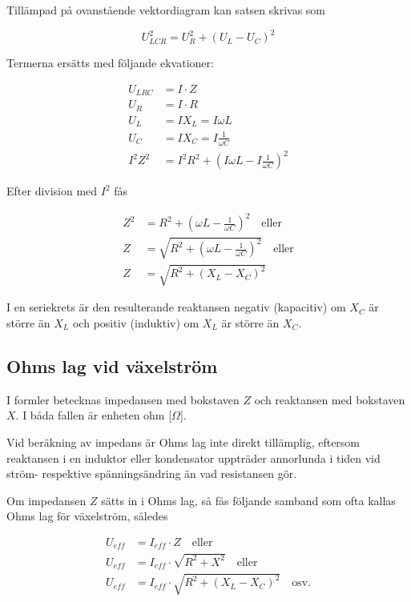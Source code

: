 Tillämpad på ovanstående vektordiagram kan satsen skrivas som

\[ U_{LCR}^2 = U_R^2 + ( U_L - U_C)^2 \]

Termerna ersätts med följande ekvationer:

\begin{align*}
  U_{LRC} &= I \cdot Z \\
  U_R &= I \cdot R \\
  U_L &= I X_L = I \omega L \\
  U_C &= I X_C = I \frac{1}{\omega C} \\
  I^2 Z^2 &= I^2 R^2 + \left( I \omega L - I\frac{1}{\omega C}\right)^2
\end{align*}

Efter division med \(I^2\) fås

\begin{align*}
  Z^2 &= R^2 + \left( \omega L - \frac{1}{\omega C} \right)^2 \quad 
  \text{eller} \\
  Z &= \sqrt{R^2 + \left(\omega L - \frac{1}{\omega C}\right)^2} \quad 
  \text{eller} \\
  Z &= \sqrt{R^2 + \left(X_L - X_C\right)^2}
\end{align*}

I en seriekrets är den resulterande reaktansen negativ (kapacitiv) om \(X_C\) är
större än \(X_L\) och positiv (induktiv) om \(X_L\) är större än \(X_C\).

\subsection{Ohms lag vid växelström}

I formler betecknas impedansen med bokstaven \(Z\) och reaktansen med bokstaven
\(X\).
I båda fallen är enheten ohm [\(\Omega\)].

Vid beräkning av impedans är Ohms lag inte direkt tillämplig, eftersom
reaktansen i en induktor eller kondensator uppträder annorlunda i tiden vid
ström- respektive spänningsändring än vad resistansen gör.

Om impedansen \(Z\) sätts in i Ohms lag, så fås följande samband som ofta kallas
Ohms lag för växelström, således

\begin{align*}
  U_{eff} &= I_{eff} \cdot Z \quad \text{eller} \\
  U_{eff} &= I_{eff} \cdot \sqrt{R^2 + X^2} \quad \text{eller} \\
  U_{eff} &= I_{eff} \cdot \sqrt{R^2 + (X_L - X_C)^2} \quad \text{osv.}
\end{align*}

